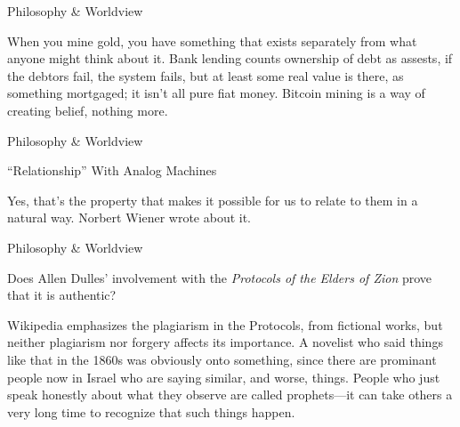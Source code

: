 \documentclass[11pt,oneside,openany,extrafontsizes]{memoir}
\begin{document}
\begin{standalonequote}{Philosophy \& Worldview}

    \begin{answer}
      When you mine gold, you have something that exists separately from what anyone might think about it. Bank lending counts ownership of debt as assests, if the debtors fail, the system fails, but at least some real value is there, as something mortgaged; it isn't all pure fiat money. Bitcoin mining is a way of creating belief, nothing more.
    \end{answer}
\end{standalonequote}

\begin{standalonequote}{Philosophy \& Worldview}

    \begin{note}
        \enquote{Relationship} With Analog Machines
    \end{note}

    \begin{answer}
      Yes, that's the property that makes it possible for us to relate to them in a natural way. Norbert Wiener wrote about it.
    \end{answer}
\end{standalonequote}

\begin{qaexchange}{Philosophy \& Worldview}

    \begin{question}
        Does Allen Dulles' involvement with the \textit{Protocols of the Elders of Zion} prove that it is authentic?
    \end{question}

    \begin{answer}
      Wikipedia emphasizes the plagiarism in the Protocols, from fictional works, but neither plagiarism nor forgery affects its importance. A novelist who said things like that in the 1860s was obviously onto something, since there are prominant people now in Israel who are saying similar, and worse, things. People who just speak honestly about what they observe are called prophets---it can take others a very long time to recognize that such things happen.
    \end{answer}
\end{qaexchange}
\end{document}
